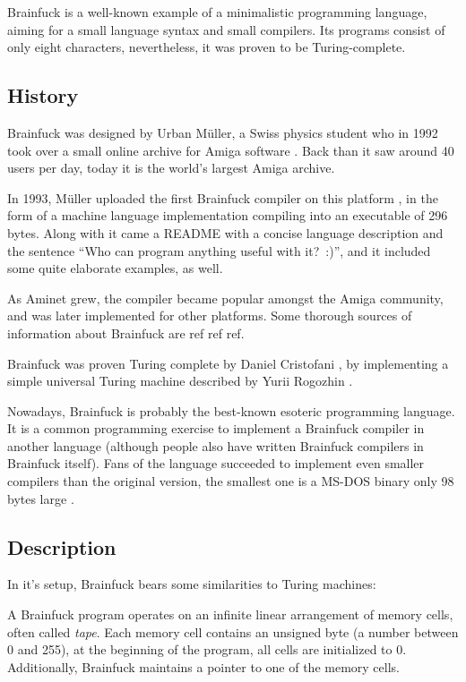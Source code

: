 Brainfuck is a well-known example of a minimalistic programming language, aiming for a small language syntax and small compilers. Its programs consist of only eight characters, nevertheless, it was proven to be Turing-complete.

\subsection{History}

Brainfuck was designed by Urban Müller, a Swiss physics student who in 1992 took over a small online archive for Amiga software \cite{muller1993aminet}. Back than it saw around 40 users per day, today it is the world's largest Amiga archive.

In 1993, Müller uploaded the first Brainfuck compiler on this platform \cite{muller1993240}, in the form of a machine language implementation compiling into an executable of 296 bytes. Along with it came a README with a concise language description and the sentence “Who can program anything useful with it?~:)”, and it included some quite elaborate examples, as well.

As Aminet grew, the compiler became popular amongst the Amiga community, and was later implemented for other platforms. Some thorough sources of information about Brainfuck are ref ref ref.

Brainfuck was proven Turing complete by Daniel Cristofani \cite{cristofani-universal}, by implementing a simple universal Turing machine described by Yurii Rogozhin \cite{rogozhin1996small}.

Nowadays, Brainfuck is probably the best-known esoteric programming language. It is a common programming exercise to implement a Brainfuck compiler in another language (although people also have written Brainfuck compilers in Brainfuck itself). Fans of the language succeeded to implement even smaller compilers than the original version, the smallest one is a MS-DOS binary only 98 bytes large \cite{inte1999entry}.

\subsection{Description}

In it's setup, Brainfuck bears some similarities to Turing machines:

A Brainfuck program operates on an infinite linear arrangement of memory cells, often called \emph{tape}. Each memory cell contains an unsigned byte (a number between 0 and 255), at the beginning of the program, all cells are initialized to 0. Additionally, Brainfuck maintains a pointer to one of the memory cells.

